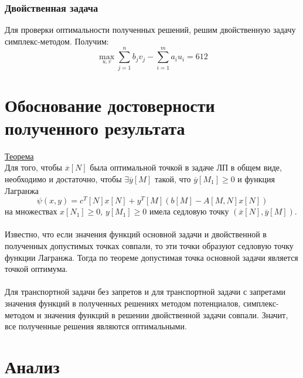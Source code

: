\subsubsection{Двойственная задача}
Для проверки оптимальности полученных решений, решим двойственную задачу симплекс-методом. Получим:
\begin{equation*}
\max_{u,v} \sum_{j=1}^n b_j v_j - \sum_{i=1}^m a_i u_i = 612
\end{equation*}


\section{Обоснование достоверности полученного результата}
\underline{Теорема}\\
Для того, чтобы $\overline{x}[N]$ была оптимальной точкой в задаче ЛП в общем виде, необходимо и достаточно, чтобы $\exists \overline{y}[M]$ такой, что $ \overline{y}[M_1]\geq0$ и функция Лагранжа
\begin{equation*}
\psi(x,y)=c^T[N]x[N]+y^T[M](b[M]-A[M,N]x[N])
\end{equation*}
на множествах $x[N_1]\geq0$, $y[M_1]\geq0$ имела седловую точку $(\overline{x}[N],\overline{y}[M])$.\\
\\
Известно, что если значения функций основной задачи и двойственной в полученных допустимых точках совпали, то эти точки образуют седловую точку функции Лагранжа. Тогда по теореме допустимая точка основной задачи является точкой оптимума. \\
\\
Для транспортной задачи без запретов и для транспортной задачи с запретами значения функций в полученных решениях методом потенциалов, симплекс-методом и значения функций в решении двойственной задачи совпали. Значит, все полученные решения являются оптимальными.


\section{Анализ}
